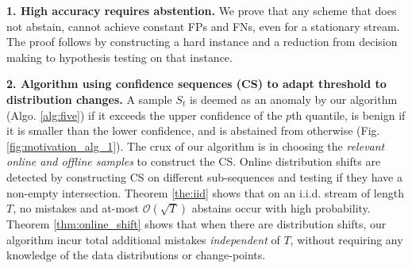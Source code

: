{\color{black} \textbf{1. High accuracy requires abstention.} We prove that any  scheme that does not abstain,  cannot achieve constant FPs and FNs, even for a stationary stream. The proof follows by constructing a hard instance and a reduction from decision making to hypothesis testing on that instance. }

{\color{black} \textbf{2. Algorithm using confidence sequences (CS) to adapt threshold to distribution changes.} 
A sample $S_t$ is deemed as an anomaly by our algorithm (Algo. \ref{alg:five}) if it exceeds the upper confidence of the $p$th quantile,  is benign if it is smaller than the lower confidence, and is abstained from otherwise (Fig. \ref{fig:motivation_alg_1}). The crux of our algorithm is in choosing the \emph{relevant online and offline samples} to construct the CS. Online distribution shifts are detected by constructing CS on different sub-sequences and testing if they have a non-empty intersection. Theorem \ref{the:iid} shows that on an i.i.d. stream of length $T$, no mistakes  and at-most $\mathcal{O}(\sqrt{T})$ abstains occur with high probability. 
Theorem \ref{thm:online_shift} shows that when there are distribution shifts, our algorithm incur total additional mistakes \emph{independent} of $T$, without requiring any knowledge of the data distributions or change-points.


}
